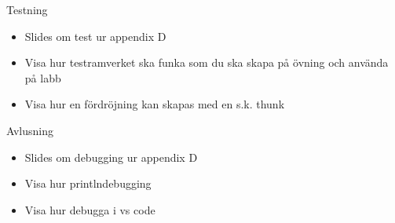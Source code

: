 
\begin{Slide}{Testning}
\TODO 
\begin{itemize}
\item Slides om test ur appendix D
\item Visa hur testramverket ska funka som du ska skapa på övning och använda på labb
\item Visa hur en fördröjning kan skapas med en s.k. thunk 
\end{itemize}
\end{Slide}


\begin{Slide}{Avlusning}
\TODO 
\begin{itemize}
\item Slides om debugging ur appendix D
\item Visa hur printlndebugging
\item Visa hur debugga i vs code
\end{itemize}
\end{Slide}







